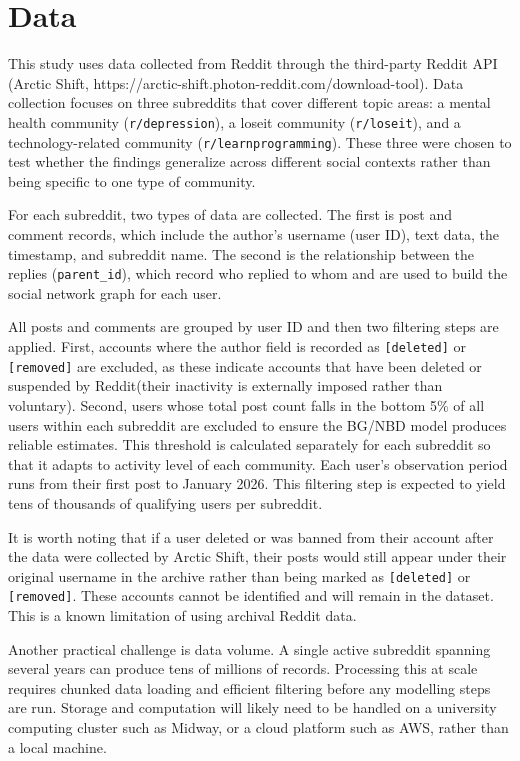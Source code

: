 \documentclass[12pt]{article}
\begin{document}
\section{Data}

This study uses data collected from Reddit through the third-party Reddit API (Arctic Shift, https://arctic-shift.photon-reddit.com/download-tool). Data collection focuses on three subreddits that cover different topic areas: a mental health community (\texttt{r/depression}), a loseit community (\texttt{r/loseit}), and a technology-related community (\texttt{r/learnprogramming}). These three were chosen to test whether the findings generalize across different social contexts rather than being specific to one type of community.

For each subreddit, two types of data are collected. The first is post and comment records, which include the author's username (user ID), text data, the timestamp, and subreddit name. The second is the relationship between the replies (\texttt{parent\_id}), which record who replied to whom and are used to build the social network graph for each user.

All posts and comments are grouped by user ID and then two filtering steps are applied. First, accounts where the author field is recorded as \texttt{[deleted]} or \texttt{[removed]} are excluded, as these indicate accounts that have been deleted or suspended by Reddit(their inactivity is externally imposed rather than voluntary).  Second, users whose total post count falls in the bottom 5\%  of all users within each subreddit are excluded to ensure the BG/NBD model produces reliable estimates. This threshold is calculated separately for each subreddit so that it adapts to activity level of each community. Each user's observation period runs from their first post to January 2026. This filtering step is expected to yield tens of thousands of qualifying users per subreddit.

It is worth noting that if a user deleted or was banned from their account after the data were collected by Arctic Shift, their posts would still appear under their original username in the archive rather than being marked as \texttt{[deleted]} or \texttt{[removed]}. These accounts cannot be identified and will remain in the dataset. This is a known limitation of using archival Reddit data.

Another practical challenge is data volume. A single active subreddit spanning several years can produce tens of millions of records. Processing this at scale requires chunked data loading and efficient filtering before any modelling steps are run. Storage and computation will likely need to be handled on a university computing cluster such as Midway, or a cloud platform such as AWS, rather than a local machine.
\end{document}
